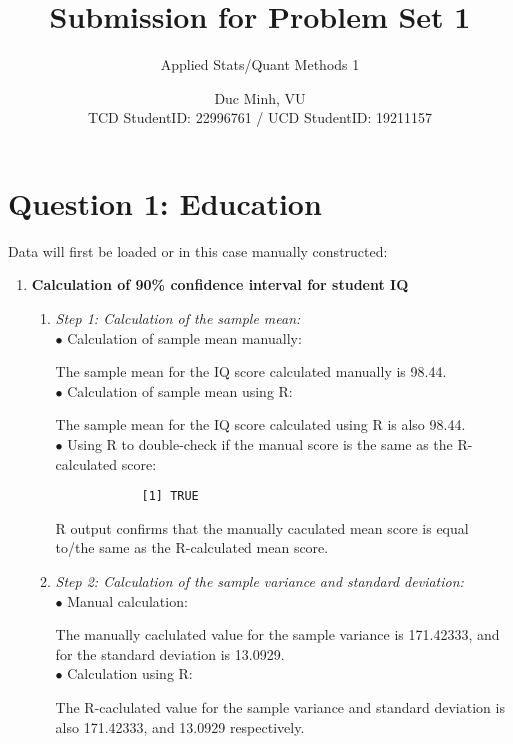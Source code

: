 \documentclass[12pt,letterpaper]{article}
\title{Submission for Problem Set 1}
\date{Duc Minh, VU \\
TCD StudentID: 22996761 / UCD StudentID: 19211157}
\author{Applied Stats/Quant Methods 1}
\begin{document}
\maketitle
\section*{Question 1: Education}
\noindent Data will first be loaded or in this case manually constructed: 



\begin{enumerate} 
	\item \textbf{Calculation of 90\% confidence interval for student IQ}
	\begin{enumerate}
		\item \textit{Step 1: Calculation of the sample mean:}\\
		$\bullet$ Calculation of sample mean manually:
			
		The sample mean for the IQ score calculated manually is 98.44. \\
		$\bullet$ Calculation of sample mean using R:
			
		The sample mean for the IQ score calculated using R is also 98.44. \\
		$\bullet$ Using R to double-check if the manual score is the same as the R-calculated score:
			
		\begin{verbatim}
			[1] TRUE
		\end{verbatim}
		R output confirms that the manually caculated mean score is equal to/the same as the R-calculated mean score.
		\item \textit{Step 2: Calculation of the sample variance and standard deviation:}\\
		$\bullet$ Manual calculation:
			
		The manually caclulated value for the sample variance is 171.42333, and for the standard deviation is 13.0929. \\
		$\bullet$ Calculation using R:
			
		The R-caclulated value for the sample variance and standard deviation is also 171.42333, and 13.0929 respectively.\\

\end{enumerate}
\end{enumerate}
\end{document}
